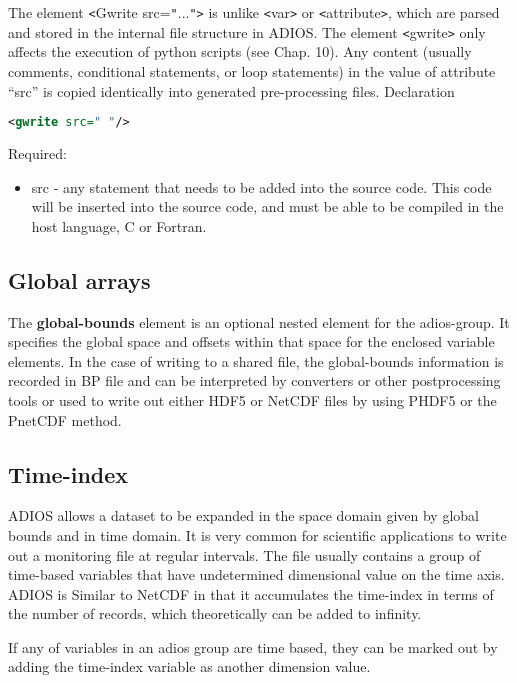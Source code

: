 \leftskip=0pt
\parindent=0pt
The element \texttt{<}Gwrite src=\texttt{"}...\texttt{"}\texttt{>} is unlike \texttt{<}var\texttt{>} 
or \texttt{<}attribute\texttt{>}, which are parsed and stored in the internal file 
structure in ADIOS. The element \texttt{<}gwrite\texttt{>} only affects the execution 
of python scripts (see Chap. 10). Any content (usually comments, conditional statements, 
or loop statements) in the value of attribute ``src'' is copied identically into 
generated pre-processing files. Declaration
\begin{lstlisting}[language=XML]
<gwrite src=" "/>
\end{lstlisting}

Required:
\begin{itemize}
\item src -  any statement that needs to be added into the source code. This code will 
be inserted into the source code, and must be able to be compiled in the host language, 
C or Fortran. 
\end{itemize}

\subsection{Global arrays}
The \textbf{global-bounds} element is an optional nested element for the adios-group. 
It specifies the global space and offsets within that space for the enclosed variable 
elements. In the case of writing to a shared file, the global-bounds information 
is recorded in BP file and can be interpreted by converters or other postprocessing 
tools or used to write out either HDF5 or NetCDF files by using PHDF5 or the PnetCDF 
method.

\subsection{Time-index}

ADIOS allows a dataset to be expanded in the space domain given by global bounds 
and in time domain. It is very common for scientific applications to write out 
a monitoring file at regular intervals. The file usually contains a group of time-based 
variables that have undetermined dimensional value on the time axis. ADIOS is Similar 
to NetCDF in that it accumulates the time-index in terms of the number of records, 
which theoretically can be added to infinity.

If any of variables in an adios group are time based, they can be marked out by 
adding the time-index variable as another dimension value. 


